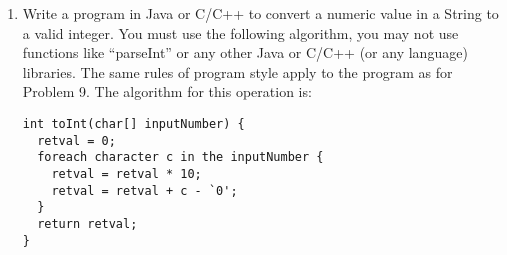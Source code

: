 \documentclass[12pt]{article}
\begin{document}
\begin{enumerate}
    \item Write a program in Java or C/C++ to convert a numeric value in a String to a valid integer. You must use the following algorithm, you may not use functions like “parseInt” or any other Java or C/C++ (or any language) libraries. The same rules of program style apply to the program as for Problem 9. The algorithm for this operation is:


\begin{lstlisting}
int toInt(char[] inputNumber) {
  retval = 0;
  foreach character c in the inputNumber {
    retval = retval * 10;
    retval = retval + c - `0';
  }
  return retval;
}
\end{lstlisting}

  \end{enumerate}
\end{document}
